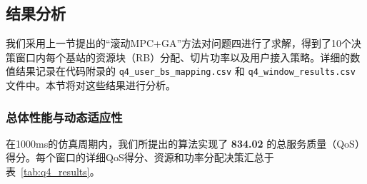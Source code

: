 \subsection{结果分析}
我们采用上一节提出的“滚动MPC+GA”方法对问题四进行了求解，得到了10个决策窗口内每个基站的资源块（RB）分配、切片功率以及用户接入策略。详细的数值结果记录在代码附录的 \texttt{q4\_user\_bs\_mapping.csv} 和 \texttt{q4\_window\_results.csv} 文件中。本节将对这些结果进行分析。

\subsubsection{总体性能与动态适应性}
在1000ms的仿真周期内，我们所提出的算法实现了 \textbf{834.02} 的总服务质量（QoS）得分。每个窗口的详细QoS得分、资源和功率分配决策汇总于表~\ref{tab:q4_results}。

